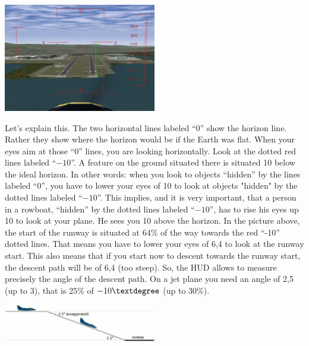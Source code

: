 \begin{itemize}
\begin{itemize}
\begin{center}
\includegraphics[width=0.5\textwidth]{img/tut_54}
\end{center}

Let's explain this. The two horizontal lines labeled ``0'' show the
horizon line. Rather they show where the horizon would be if the Earth
was flat. When your eyes aim at those ``0'' lines, you are looking
horizontally. Look at the dotted red lines labeled ``$-10$''. A feature
on the ground situated there is situated 10\textdegree{} below the
ideal horizon. In other words: when you look to objects ``hidden'' by
the lines labeled ``0'', you have to lower your eyes of 10\textdegree{}
to look at objects "hidden" by the dotted lines labeled ``$-10$''. This
implies, and it is very important, that a person in a rowboat,
``hidden'' by the dotted lines labeled ``$-10$'', has to rise his eyes
up 10\textdegree{} to look at your plane. He sees you 10\textdegree{}
above the horizon. In the picture above, the start of the runway is
situated at 64\% of the way towards the red ``-10'' dotted lines. That
means you have to lower your eyes of 6,4\textdegree{} to look at the
runway start. This also means that if you start now to descent towards
the runway start, the descent path will be of 6,4\textdegree{} (too
steep). So, the  HUD allows to measure
precisely the angle of the descent path. On a jet plane you need an
angle of 2,5\textdegree{} (up to 3\textdegree{}), that is 25\% of
$-10\textdegree$ (up to 30\%).


\begin{center}
\includegraphics[width=0.5\textwidth]{img/tut_55}
\end{center}


\end{itemize}
\end{itemize}
